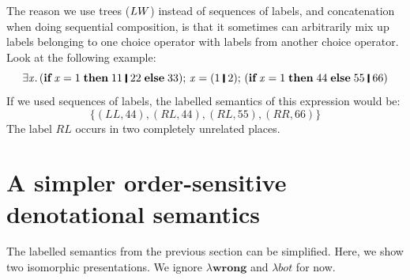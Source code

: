 \documentclass[acmsmall,review,dvipsnames]{acmart}
\newcommand{\Varid}[1]{\mathit{#1}}
\newcommand{\powerset}[1]{{\mathcal P}(#1)}
\begin{document}
The reason we use trees ($LW$) instead of sequences of labels, and concatenation when doing sequential composition, is that it sometimes can arbitrarily mix up labels belonging to one choice operator with labels from another choice operator. Look at the following example:
$$
\ensuremath{\exists\Varid{x}.\,(\textbf{if}\;\Varid{x}\mathrel{=}\mathrm{1}\;\textbf{then}\;\mathrm{11}\;\rule[-0.1em]{0.15em}{0.75em}\;\mathrm{22}\;\textbf{else}\;\mathrm{33});\,\Varid{x}\mathrel{=}(\mathrm{1}\;\rule[-0.1em]{0.15em}{0.75em}\;\mathrm{2});\,(\textbf{if}\;\Varid{x}\mathrel{=}\mathrm{1}\;\textbf{then}\;\mathrm{44}\;\textbf{else}\;\mathrm{55}\;\rule[-0.1em]{0.15em}{0.75em}\;\mathrm{66})}
$$
If we used sequences of labels, the labelled semantics of this expression would be:
$$
\{ (LL, 44), (RL, 44), (RL, 55), (RR, 66) \} 
$$
The label $RL$ occurs in two completely unrelated places.

\section{A simpler order-sensitive denotational semantics} \label{sec:simple-order-sensitive}

The labelled semantics from the previous section can be simplified. Here, we show two isomorphic presentations. We ignore \ensuremath{\lambda \textbf{wrong}} and \ensuremath{\lambda \Varid{bot}} for now.

\newcommand{\sseq}{\mathit{seq}}
\newcommand{\powersett}{\powerset}
\end{document}
